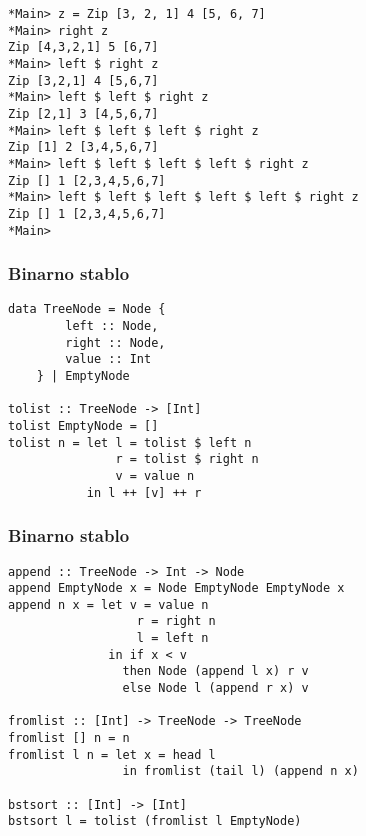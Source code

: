 \documentclass{beamer}
\begin{document}
\begin{frame}[fragile]
\begin{lstlisting}
*Main> z = Zip [3, 2, 1] 4 [5, 6, 7]
*Main> right z 
Zip [4,3,2,1] 5 [6,7]
*Main> left $ right z 
Zip [3,2,1] 4 [5,6,7]
*Main> left $ left $ right z 
Zip [2,1] 3 [4,5,6,7]
*Main> left $ left $ left $ right z 
Zip [1] 2 [3,4,5,6,7]
*Main> left $ left $ left $ left $ right z 
Zip [] 1 [2,3,4,5,6,7]
*Main> left $ left $ left $ left $ left $ right z 
Zip [] 1 [2,3,4,5,6,7]
*Main> 
\end{lstlisting}
\end{frame}


\begin{frame}[fragile]
\frametitle{Binarno stablo}
\begin{lstlisting}
data TreeNode = Node {
        left :: Node,
        right :: Node,
        value :: Int
    } | EmptyNode

tolist :: TreeNode -> [Int]
tolist EmptyNode = []
tolist n = let l = tolist $ left n
               r = tolist $ right n
               v = value n
           in l ++ [v] ++ r
\end{lstlisting}
\end{frame}

\begin{frame}[fragile]
\frametitle{Binarno stablo}
\begin{lstlisting}
append :: TreeNode -> Int -> Node
append EmptyNode x = Node EmptyNode EmptyNode x
append n x = let v = value n
                  r = right n
                  l = left n
              in if x < v 
                then Node (append l x) r v 
                else Node l (append r x) v

fromlist :: [Int] -> TreeNode -> TreeNode
fromlist [] n = n
fromlist l n = let x = head l
                in fromlist (tail l) (append n x)

bstsort :: [Int] -> [Int]
bstsort l = tolist (fromlist l EmptyNode)
\end{lstlisting}
\end{frame}


\end{document}
